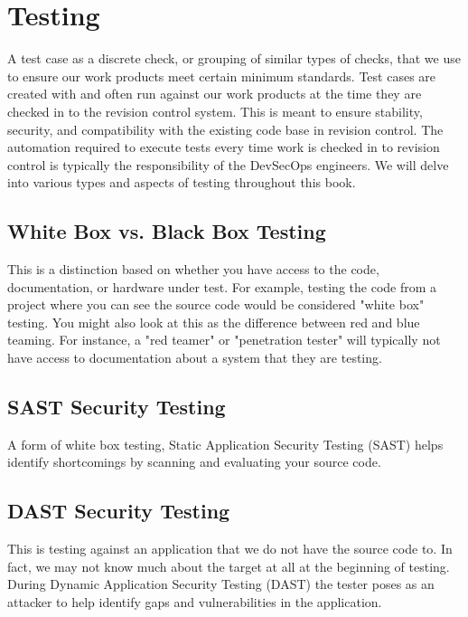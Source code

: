 \section{Testing}

\justify{}
A test case as a discrete check, or grouping of similar types of checks,
that we use to ensure our work products meet certain minimum standards. Test cases are created with
and often run against our work products at the time they are checked in to the revision control system.
This is meant to ensure stability, security, and compatibility with the existing code base in revision
control. The automation required to execute tests every time work is checked in to
revision control is typically the responsibility of the DevSecOps engineers. We will delve into various
types and aspects of testing throughout this book. 

\subsection{White Box vs. Black Box Testing}

\justify{}
This is a distinction based on whether you have access to the code, documentation, or hardware under test.
For example, testing the code from a project where you can see the source code would be considered "white box"
testing. You might also look at this as the difference between red and blue
teaming. For instance, a "red teamer" or "penetration tester" will typically not have
access to documentation about a system that they are testing.

\subsection{SAST Security Testing}

\justify{}
A form of white box testing, Static Application Security Testing (SAST) helps identify
shortcomings by scanning and evaluating your source code.

\subsection{DAST Security Testing}

\justify{}
This is testing against an application that we do not have the source code to. In fact, we may not know much
about the target at all at the beginning of testing. During Dynamic Application Security Testing (DAST)
the tester poses as an attacker to help identify gaps and vulnerabilities in the application.

